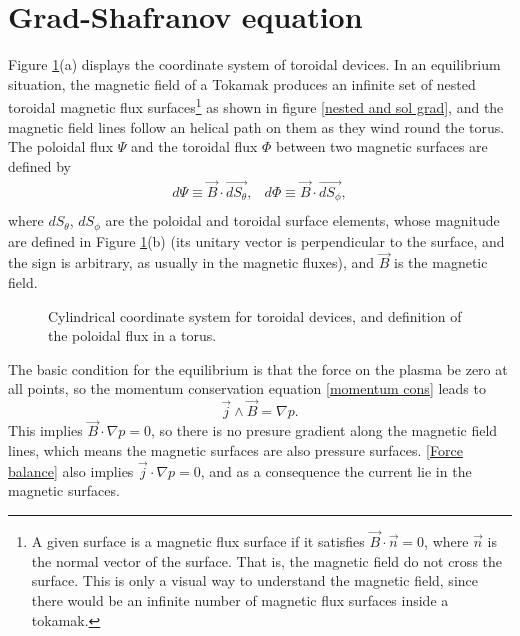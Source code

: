 \documentclass[a4paper,12pt,oneside]{book}
\begin{document}
\section[G-S equation]{Grad-Shafranov equation}
\label{sec grad}

Figure \ref{coord y flux}(a) displays the coordinate system of toroidal devices. In an equilibrium situation, the magnetic field of a Tokamak produces an infinite set of nested toroidal magnetic flux surfaces\footnote{A given surface is a magnetic flux surface if it satisfies $\vec{B} \cdot \vec{n}=0$, where $\vec{n}$ is the normal vector of the surface. That is, the magnetic field do not cross the surface. This is only a visual way to understand the magnetic field, since there would be an infinite number of magnetic flux surfaces inside a tokamak.} as shown in figure \ref{nested and sol grad}, and the magnetic field lines follow an helical path on them as they wind round the torus. The poloidal flux $\Psi$ and the toroidal flux $\Phi$ between two magnetic surfaces are defined by
%
\begin{equation}
\begin{array}{cc}

d\Psi \equiv \vec{B} \cdot \vec{dS_\theta}, & d\Phi \equiv \vec{B} \cdot \vec{dS_\phi},\\

\end{array}
\end{equation}
%
where $dS_\theta$, $dS_\phi$ are the poloidal and toroidal surface elements, whose magnitude are defined in Figure \ref{coord y flux}(b) (its unitary vector is perpendicular to the surface, and the sign is arbitrary, as usually in the magnetic fluxes), and $\vec{B}$ is the magnetic field.
%
\begin{figure}[htbp]
\centering
{}
\hspace{3cm}
\caption{Cylindrical coordinate system for toroidal devices, and definition of the poloidal flux in a torus.}
\label{coord y flux}
\end{figure}
%
The basic condition for the equilibrium is that the force on the plasma be zero at all points, so the momentum conservation equation \eqref{momentum cons} leads to
%
\begin{equation} \label{Force balance}
\vec{j} \wedge \vec{B} = \nabla p .
\end{equation}
%
This implies $\vec{B} \cdot \nabla p=0$, so there is no presure gradient along the magnetic field lines, which means the magnetic surfaces are also pressure surfaces. \eqref{Force balance} also implies $\vec{j} \cdot \nabla p=0$, and as a consequence the current lie in the magnetic surfaces. 
\end{document}
